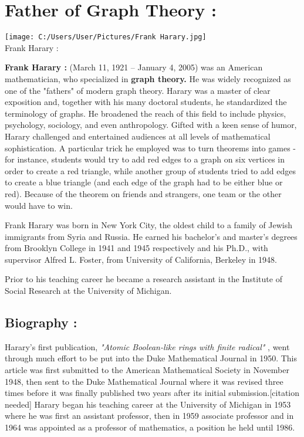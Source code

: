 \documentclass[12pt,letterpaper]{report}
\begin{document}
\section{Father of Graph Theory :}
\texttt{[image: C:/Users/User/Pictures/Frank Harary.jpg]}\\
{\huge Frank Harary :} \\
{{\color{red}\textbf{Frank Harary :} }(March 11, 1921 – January 4, 2005) was an American mathematician, who specialized in {\textbf{graph theory.}} He was widely recognized as one of the "fathers" of modern graph theory. Harary was a master of clear exposition and, together with his many doctoral students, he standardized the terminology of graphs. He broadened the reach of this field to include physics, psychology, sociology, and even anthropology. Gifted with a keen sense of humor, Harary challenged and entertained audiences at all levels of mathematical sophistication. A particular trick he employed was to turn theorems into games - for instance, students would try to add red edges to a graph on six vertices in order to create a red triangle, while another group of students tried to add edges to create a blue triangle (and each edge of the graph had to be either blue or red). Because of the theorem on friends and strangers, one team or the other would have to win.

Frank Harary was born in New York City, the oldest child to a family of Jewish immigrants from Syria and Russia. He earned his bachelor's and master's degrees from Brooklyn College in 1941 and 1945 respectively and his Ph.D., with supervisor Alfred L. Foster, from University of California, Berkeley in 1948.

Prior to his teaching career he became a research assistant in the Institute of Social Research at the University of Michigan.
\subsection{{\color{blue} Biography :}}
{\Huge \color{cyan}H}arary's first publication, {\color{red}\textit{"Atomic Boolean-like rings with finite radical"} }, went through much effort to be put into the Duke Mathematical Journal in 1950. This article was first submitted to the American Mathematical Society in November 1948, then sent to the Duke Mathematical Journal where it was revised three times before it was finally published two years after its initial submission.[citation needed] Harary began his teaching career at the University of Michigan in 1953 where he was first an assistant professor, then in 1959 associate professor and in 1964 was appointed as a professor of mathematics, a position he held until 1986.\\
\newpage
}
\end{document}
